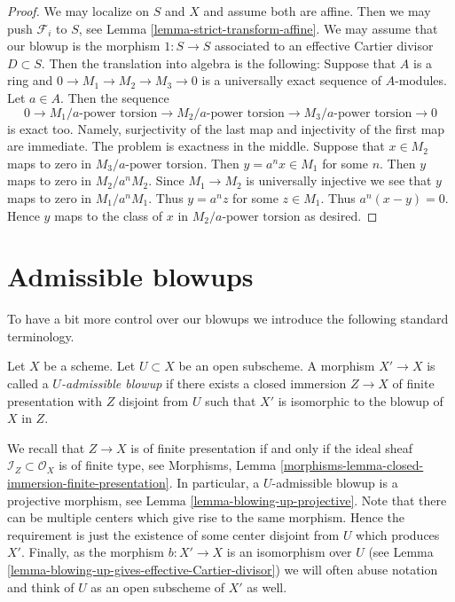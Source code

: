 \begin{proof}
We may localize on $S$ and $X$ and assume both are affine.
Then we may push $\mathcal{F}_i$ to $S$, see
Lemma \ref{lemma-strict-transform-affine}.
We may assume that our blowup is the morphism $1 : S \to S$
associated to an effective Cartier divisor $D \subset S$.
Then the translation into algebra is the following: Suppose that $A$
is a ring and $0 \to M_1 \to M_2 \to M_3 \to 0$ is a universally
exact sequence of $A$-modules. Let $a\in A$. Then the sequence
$$
0 \to
M_1/a\text{-power torsion} \to
M_2/a\text{-power torsion} \to
M_3/a\text{-power torsion} \to 0
$$
is exact too. Namely, surjectivity of the last map and injectivity of
the first map are immediate. The problem is exactness in the middle.
Suppose that $x \in M_2$ maps to zero in $M_3/a\text{-power torsion}$.
Then $y = a^n x \in M_1$ for some $n$. Then $y$ maps to zero in
$M_2/a^nM_2$. Since $M_1 \to M_2$ is universally injective we see that
$y$ maps to zero in $M_1/a^nM_1$. Thus $y = a^n z$ for some $z \in M_1$.
Thus $a^n(x - y) = 0$. Hence $y$ maps to the class of $x$ in
$M_2/a\text{-power torsion}$ as desired.
\end{proof}







\section{Admissible blowups}
\label{section-admissible-blowups}

\noindent
To have a bit more control over our blowups we introduce the following
standard terminology.

\begin{definition}
\label{definition-admissible-blowup}
Let $X$ be a scheme. Let $U \subset X$ be an open subscheme. A morphism
$X' \to X$ is called a {\it $U$-admissible blowup} if there exists a
closed immersion $Z \to X$ of finite presentation with $Z$ disjoint from
$U$ such that $X'$ is isomorphic to the blowup of $X$ in $Z$.
\end{definition}

\noindent
We recall that $Z \to X$ is of finite presentation if and only if the
ideal sheaf $\mathcal{I}_Z \subset \mathcal{O}_X$ is of finite type, see
Morphisms, Lemma \ref{morphisms-lemma-closed-immersion-finite-presentation}.
In particular, a $U$-admissible blowup is a projective morphism, see
Lemma \ref{lemma-blowing-up-projective}.
Note that there can be multiple centers which give rise to the same morphism.
Hence the requirement is just the existence of some center disjoint from
$U$ which produces $X'$.
Finally, as the morphism $b : X' \to X$ is an isomorphism over $U$ (see
Lemma \ref{lemma-blowing-up-gives-effective-Cartier-divisor}) we will often
abuse notation and think of $U$ as an open subscheme of $X'$ as well.

